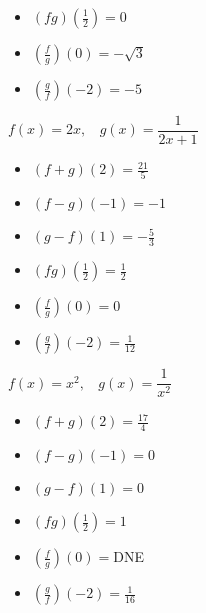 \documentclass[12pt]{book}
\theoremstyle{definition}
\begin{document}
\begin{oddenumerate}
\begin{multicols}{3}
\begin{itemize}
\item  $(fg)(\frac{1}{2})=0$
\item  $\left(\frac{f}{g}\right)(0)=-\sqrt{3}$
\item  $\left(\frac{g}{f}\right)(-2)=-5$
\end{itemize}
\end{multicols}

\item $f(x)=2x,~~~~g(x)=\dfrac{1}{2x+1}$ 
\begin{multicols}{3}
\begin{itemize}
\item  $(f+g)(2)=\frac{21}{5}$
\item  $(f-g)(-1)=-1$
\item  $(g-f)(1)=-\frac{5}{3}$
\end{itemize}
\end{multicols}

\begin{multicols}{3}
\begin{itemize}
\item  $(fg)(\frac{1}{2})=\frac{1}{2}$
\item  $\left(\frac{f}{g}\right)(0)=0$
\item  $\left(\frac{g}{f}\right)(-2)=\frac{1}{12}$
\end{itemize}
\end{multicols}

\item $f(x)=x^2,~~~~g(x)=\dfrac{1}{x^2}$ 
\begin{multicols}{3}
\begin{itemize}
\item  $(f+g)(2)=\frac{17}{4}$
\item  $(f-g)(-1)=0$
\item  $(g-f)(1)=0$
\end{itemize}
\end{multicols}

\begin{multicols}{3}
\begin{itemize}
\item  $(fg)(\frac{1}{2})=1$
\item  $\left(\frac{f}{g}\right)(0)=$DNE
\item  $\left(\frac{g}{f}\right)(-2)=\frac{1}{16}$
\end{itemize}
\end{multicols}


\end{oddenumerate}
\end{document}
